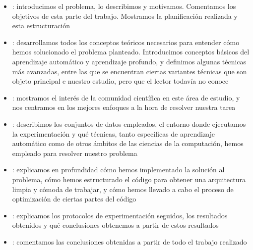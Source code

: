 \begin{itemize}
	\item {}: introducimos el problema, lo describimos y motivamos. Comentamos los objetivos de esta parte del trabajo. Mostramos la planificación realizada y esta estructuración
	\item {}: desarrollamos todos los conceptos teóricos necesarios para entender cómo hemos solucionado el problema planteado. Introducimos conceptos básicos del aprendizaje automático y aprendizaje profundo, y definimos algunas técnicas más avanzadas, entre las que se encuentran ciertas variantes técnicas que son objeto principal e nuestro estudio, pero que el lector todavía no conoce
	\item {}: mostramos el interés de la comunidad científica en este área de estudio, y nos centramos en los mejores enfoques a la hora de resolver nuestra tarea
	\item {}: describimos los conjuntos de datos empleados, el entorno donde ejecutamos la experimentación y qué técnicas, tanto específicas de aprendizaje automático como de otros ámbitos de las ciencias de la computación, hemos empleado para resolver nuestro problema
	\item {}: explicamos en profundidad cómo hemos implementado la solución al problema, cómo hemos estructurado el código para obtener una arquitectura limpia y cómoda de trabajar, y cómo hemos llevado a cabo el proceso de optimización de ciertas partes del código
	\item {}: explicamos los protocolos de experimentación seguidos, los resultados obtenidos y qué conclusiones obtenemos a partir de estos resultados
	\item {}: comentamos las conclusiones obtenidas a partir de todo el trabajo realizado
\end{itemize}
